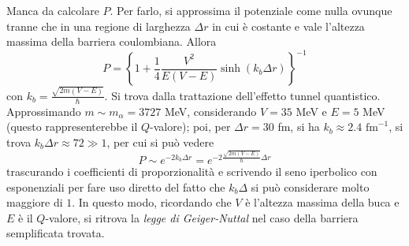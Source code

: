 \documentclass[11pt, a4paper]{scrartcl}
\theoremstyle{style}
\numberwithin{equation}{subsection}
\begin{document}
Manca da calcolare $P$. Per farlo, si approssima il potenziale come nulla ovunque tranne che in una regione di larghezza $\Delta r$ in cui \`e costante e vale l'altezza massima della barriera coulombiana.
Allora 
\[
P = \left\{ 1 + \frac{1}{4} \frac{V^2}{E(V-E)} \operatorname{sinh} (k_b\Delta r)  \right\} ^{-1}
\] 
con $k_b = \frac{\sqrt{2m (V-E)} }{\hbar }$.
Si trova dalla trattazione dell'effetto tunnel quantistico.
Approssimando $m \sim m_\alpha = 3727$ MeV, considerando $V = 35$ MeV e $E = 5$ MeV (questo rappresenterebbe il $Q$-valore); poi, per $\Delta r = 30$ fm, si ha  $k_b \approx 2.4 \text{ fm}^{-1}$, si trova $k_b\Delta r \approx 72 \gg 1$, per cui si pu\`o vedere 
\[
P \sim e^{-2 k_b \Delta r} = e^{-2 \frac{\sqrt{2 m (V-E)} }{\hbar }\Delta r} 
\] 
trascurando i coefficienti di proporzionalit\`a e scrivendo il seno iperbolico con esponenziali per fare uso diretto del fatto che $k_b \Delta$ si pu\`o considerare molto maggiore di $1$.
In questo modo, ricordando che $V$ \`e l'altezza massima della buca e $E$ \`e il $Q$-valore, si ritrova la \textit{legge di Geiger-Nuttal} nel caso della barriera semplificata trovata.
\end{document}
